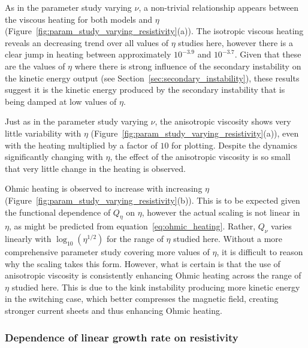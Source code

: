 As in the parameter study varying $\nu$, a non-trivial relationship appears between the viscous heating for both models and $\eta$ (Figure~\ref{fig:param_study_varying_resistivity}(a)). The isotropic viscous heating reveals an decreasing trend over all values of $\eta$ studies here, however there is a clear jump in heating between approximately $10^{-3.9}$ and $10^{-3.7}$. Given that these are the values of $\eta$ where there is strong influence of the secondary instability on the kinetic energy output (see Section~\ref{sec:secondary_instability}), these results suggest it is the kinetic energy produced by the secondary instability that is being damped at low values of $\eta$.

Just as in the parameter study varying $\nu$, the anisotropic viscosity shows very little variability with $\eta$ (Figure~\ref{fig:param_study_varying_resistivity}(a)), even with the heating multiplied by a factor of $10$ for plotting. Despite the dynamics significantly changing with $\eta$, the effect of the anisotropic viscosity is so small that very little change in the heating is observed.

Ohmic heating is observed to increase with increasing $\eta$ (Figure~\ref{fig:param_study_varying_resistivity}(b)). This is to be expected given the functional dependence of $Q_{\eta}$ on $\eta$, however the actual scaling is not linear in $\eta$, as might be predicted from equation~\eqref{eq:ohmic_heating}. Rather, $Q_{\nu}$ varies linearly with $\log_{10}(\eta^{1/2})$ for the range of $\eta$ studied here. Without a more comprehensive parameter study covering more values of $\eta$, it is difficult to reason why the scaling takes this form. However, what is certain is that the use of anisotropic viscosity is consistently enhancing Ohmic heating across the range of $\eta$ studied here. This is due to the kink instability producing more kinetic energy in the switching case, which better compresses the magnetic field, creating stronger current sheets and thus enhancing Ohmic heating.

\subsubsection{Dependence of linear growth rate on resistivity}

